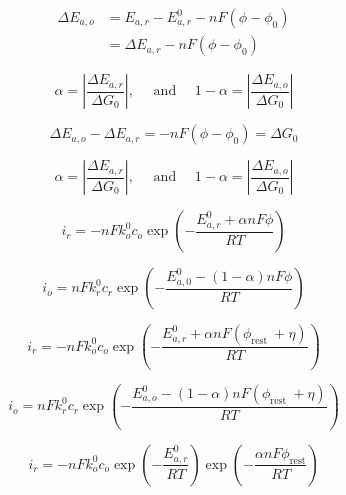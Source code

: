 \documentclass[lettersize,journal]{IEEEtran}
\begin{document}
\begin{equation}
\begin{aligned}
\Delta E_{a, o} &=E_{a, r}-E_{a, r}^{0}-n F\left(\phi-\phi_{0}\right) \\
&=\Delta E_{a, r}-n F\left(\phi-\phi_{0}\right)
\end{aligned}
\end{equation}

\begin{equation}
\alpha=\left|\frac{\Delta E_{a, r}}{\Delta G_{0}}\right|, \quad \text { and } \quad 1-\alpha=\left|\frac{\Delta E_{a, o}}{\Delta G_{0}}\right|
\end{equation}

\begin{equation}
\Delta E_{a, o}-\Delta E_{a, r}=-n F\left(\phi-\phi_{0}\right)=\Delta G_{0}
\end{equation}

\begin{equation}
\alpha=\left|\frac{\Delta E_{a, r}}{\Delta G_{0}}\right|, \quad \text { and } \quad 1-\alpha=\left|\frac{\Delta E_{a, o}}{\Delta G_{0}}\right|
\end{equation}




\begin{equation}
i_{r}=-n F k_{o}^{0} c_{o} \exp \left(-\frac{E_{a, r}^{0}+\alpha n F \phi}{R T}\right)
\end{equation}

\begin{equation}
i_{o}=n F k_{r}^{0} c_{r} \exp \left(-\frac{E_{a, 0}^{0}-(1-\alpha) n F \phi}{R T}\right)
\end{equation}

\begin{equation}
i_{r}=-n F k_{o}^{0} c_{o} \exp \left(-\frac{E_{a, r}^{0}+\alpha n F\left(\phi_{\text {rest }}+\eta\right)}{R T}\right)
\end{equation}

\begin{equation}
i_{o}=n F k_{r}^{0} c_{r} \exp \left(-\frac{E_{a, o}^{0}-(1-\alpha) n F\left(\phi_{\text {rest }}+\eta\right)}{R T}\right)
\end{equation}

\begin{equation}
i_{r}=-n F k_{o}^{0} c_{o} \exp \left(-\frac{E_{a, r}^{0}}{R T}\right) \exp \left(-\frac{\alpha n F \phi_{\mathrm{rest}}}{R T}\right)
\end{equation}
\end{document}
